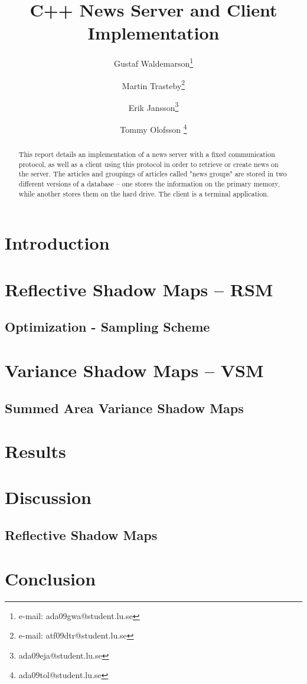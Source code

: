 \documentclass{acmsiggraph}               %
\title{C++ News Server and Client Implementation}
\author{Gustaf Waldemarson\thanks{e-mail: ada09gwa@student.lu.se} \and Martin Trasteby\thanks{e-mail: atf09dtr@student.lu.se} \and Erik Jansson\thanks{ada09eja@student.lu.se} \and Tommy Olofsson \thanks{ada09tol@student.lu.se}}
\affiliation{Faculty of Engineering (LTH), Lund University \\ Sweden}
\begin{document}
\ifpdf
\else
\fi



\maketitle

\begin{abstract}
This report details an implementation of a news server with a fixed communication protocol, as well as a client using this protocol in order to retrieve or create news on the server. The articles and groupings of articles called "news groups" are stored in two different versions of a database -- one stores the information on the primary memory, while another stores them on the hard drive. The client is a terminal application.
\end{abstract}
\keywordlist

\section{Introduction}


\section{Reflective Shadow Maps -- RSM}
\label{sec:rsm}

\subsection{Optimization - Sampling Scheme}
\label{sec:optrsm}


\section{Variance Shadow Maps -- VSM}
\label{sec:vsm}

\subsection{Summed Area Variance Shadow Maps}


\section{Results}

\section{Discussion}
\subsection{Reflective Shadow Maps}

\section{Conclusion}



%
%
\end{document}
